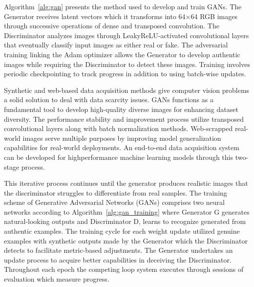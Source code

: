 \documentclass[fleqn,10pt,lineno]{wlpeerj}
\begin{document}
Algorithm~\ref{alg:gan} presents the method used to develop and train GANs. The Generator receives latent vectors which it transforms into 64×64 RGB images through successive operations of dense and transposed convolution. The Discriminator analyzes images through LeakyReLU-activated convolutional layers that eventually classify input
images as either real or fake. The adversarial training linking the Adam optimizer allows the Generator to develop authentic images while requiring the Discriminator to detect these images. Training involves periodic checkpointing to track progress in addition to using batch-wise updates. 


Synthetic and web-based data acquisition methods give computer vision problems a solid solution to deal with data scarcity issues. GANs functions as a fundamental tool to develop high-quality diverse images for enhancing dataset diversity. The performance stability and improvement process utilize transposed convolutional layers
along with batch normalization methods. Web-scrapped real-world images serve multiple purposes by improving model generalization capabilities for real-world deployments. An end-to-end data acquisition system can be developed for highperformance machine learning models through this two-stage process.


This iterative process continues until the generator produces realistic images that the discriminator struggles to differentiate from real samples. The training scheme of Generative Adversarial Networks (GANs) comprises two neural networks according to Algorithm~\ref{alg:gan_training} where Generator G generates natural-looking outputs and Discriminator D, learns to recognize generated from authentic examples. The training cycle for each
weight update utilized genuine examples with synthetic outputs made by the Generator which the Discriminator detects to facilitate metric-based adjustments. The Generator undertakes an update process to acquire better capabilities in deceiving the Discriminator. Throughout each epoch the competing loop system executes through sessions of evaluation which measure progress.
\end{document}
